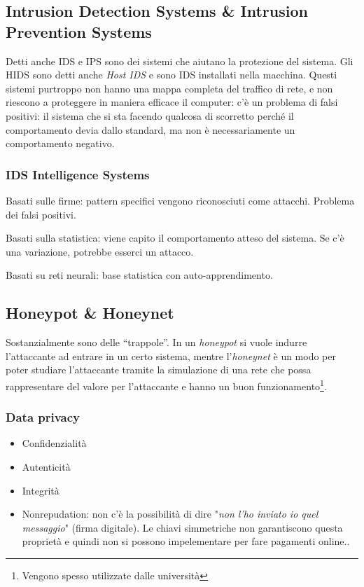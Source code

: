 \documentclass{book}
\begin{document}
\subsection{Intrusion Detection Systems \& Intrusion Prevention Systems}

Detti anche IDS e IPS sono dei sistemi che aiutano la protezione del sistema. Gli HIDS sono detti anche \textit{Host IDS} e sono IDS installati nella macchina. Questi sistemi purtroppo non hanno una mappa completa del traffico di rete, e non riescono a proteggere in maniera efficace il computer: c'è un problema di falsi positivi: il sistema che si sta facendo qualcosa di scorretto perché il comportamento devia dallo standard, ma non è necessariamente un comportamento negativo.

\subsubsection{IDS Intelligence Systems}

Basati sulle firme: pattern specifici vengono riconosciuti come attacchi. Problema dei falsi positivi.

Basati sulla statistica: viene capito il comportamento atteso del sistema. Se c'è una variazione, potrebbe esserci un attacco.

Basati su reti neurali: base statistica con auto-apprendimento.

\subsection{Honeypot \& Honeynet}

Sostanzialmente sono delle ``trappole''. In un \textit{honeypot} si vuole indurre l'attaccante ad entrare in un certo sistema, mentre l'\textit{honeynet} è un modo per poter studiare l'attaccante tramite la simulazione di una rete che possa rappresentare del valore per l'attaccante e hanno un buon funzionamento\footnote{Vengono spesso utilizzate dalle università}.

\subsubsection{Data privacy}

\begin{itemize}
\item Confidenzialità
\item Autenticità
\item Integrità
\item Nonrepudation: non c'è la possibilità di dire "\textit{non l'ho inviato io quel messaggio}" (firma digitale). Le chiavi simmetriche non garantiscono questa proprietà e quindi non si possono impelementare per fare pagamenti online..
\end{itemize}
\end{document}
